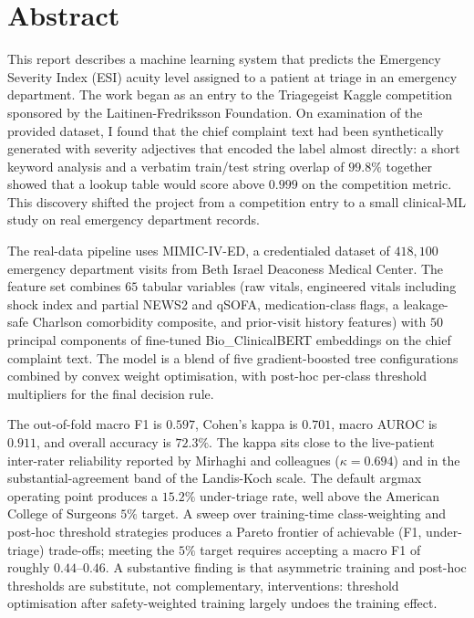 
\chapter*{Abstract}
\label{ch:abstract}

This report describes a machine learning system that predicts the Emergency Severity Index (ESI) acuity level assigned to a patient at triage in an emergency department. The work began as an entry to the Triagegeist Kaggle competition sponsored by the Laitinen-Fredriksson Foundation. On examination of the provided dataset, I found that the chief complaint text had been synthetically generated with severity adjectives that encoded the label almost directly: a short keyword analysis and a verbatim train/test string overlap of $99.8\%$ together showed that a lookup table would score above $0.999$ on the competition metric. This discovery shifted the project from a competition entry to a small clinical-ML study on real emergency department records.

The real-data pipeline uses MIMIC-IV-ED, a credentialed dataset of $418{,}100$ emergency department visits from Beth Israel Deaconess Medical Center. The feature set combines $65$ tabular variables (raw vitals, engineered vitals including shock index and partial NEWS2 and qSOFA, medication-class flags, a leakage-safe Charlson comorbidity composite, and prior-visit history features) with $50$ principal components of fine-tuned Bio\_ClinicalBERT embeddings on the chief complaint text. The model is a blend of five gradient-boosted tree configurations combined by convex weight optimisation, with post-hoc per-class threshold multipliers for the final decision rule.

The out-of-fold macro F1 is $0.597$, Cohen's kappa is $0.701$, macro AUROC is $0.911$, and overall accuracy is $72.3\%$. The kappa sits close to the live-patient inter-rater reliability reported by Mirhaghi and colleagues ($\kappa = 0.694$) and in the substantial-agreement band of the Landis-Koch scale. The default argmax operating point produces a $15.2\%$ under-triage rate, well above the American College of Surgeons $5\%$ target. A sweep over training-time class-weighting and post-hoc threshold strategies produces a Pareto frontier of achievable (F1, under-triage) trade-offs; meeting the $5\%$ target requires accepting a macro F1 of roughly $0.44$--$0.46$. A substantive finding is that asymmetric training and post-hoc thresholds are substitute, not complementary, interventions: threshold optimisation after safety-weighted training largely undoes the training effect.

